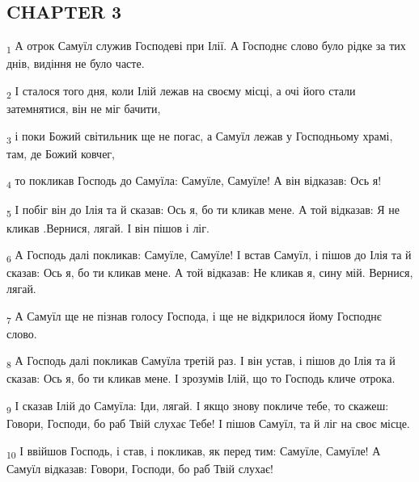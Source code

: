 \subsection{CHAPTER 3}
\begin{tcolorbox}
\textsubscript{1} А отрок Самуїл служив Господеві при Ілії. А Господнє слово було рідке за тих днів, видіння не було часте.
\end{tcolorbox}
\begin{tcolorbox}
\textsubscript{2} І сталося того дня, коли Ілій лежав на своєму місці, а очі його стали затемнятися, він не міг бачити,
\end{tcolorbox}
\begin{tcolorbox}
\textsubscript{3} і поки Божий світильник ще не погас, а Самуїл лежав у Господньому храмі, там, де Божий ковчег,
\end{tcolorbox}
\begin{tcolorbox}
\textsubscript{4} то покликав Господь до Самуїла: Самуїле, Самуїле! А він відказав: Ось я!
\end{tcolorbox}
\begin{tcolorbox}
\textsubscript{5} І побіг він до Ілія та й сказав: Ось я, бо ти кликав мене. А той відказав: Я не кликав .Вернися, лягай. І він пішов і ліг.
\end{tcolorbox}
\begin{tcolorbox}
\textsubscript{6} А Господь далі покликав: Самуїле, Самуїле! І встав Самуїл, і пішов до Ілія та й сказав: Ось я, бо ти кликав мене. А той відказав: Не кликав я, сину мій. Вернися, лягай.
\end{tcolorbox}
\begin{tcolorbox}
\textsubscript{7} А Самуїл ще не пізнав голосу Господа, і ще не відкрилося йому Господнє слово.
\end{tcolorbox}
\begin{tcolorbox}
\textsubscript{8} А Господь далі покликав Самуїла третій раз. І він устав, і пішов до Ілія та й сказав: Ось я, бо ти кликав мене. І зрозумів Ілій, що то Господь кличе отрока.
\end{tcolorbox}
\begin{tcolorbox}
\textsubscript{9} І сказав Ілій до Самуїла: Іди, лягай. І якщо знову покличе тебе, то скажеш: Говори, Господи, бо раб Твій слухає Тебе! І пішов Самуїл, та й ліг на своє місце.
\end{tcolorbox}
\begin{tcolorbox}
\textsubscript{10} І ввійшов Господь, і став, і покликав, як перед тим: Самуїле, Самуїле! А Самуїл відказав: Говори, Господи, бо раб Твій слухає!
\end{tcolorbox}
